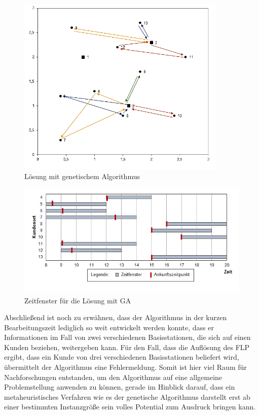 \documentclass[a4paper,12pt,parskip,bibtotoc,liststotoc]{article}
\begin{document}
\begin{figure}[h!]
  \begin{center}
      \includegraphics[width=100mm]{vrp33a.png}
    \caption{Lösung mit genetischem Algorithmus}  \label{Typen}
  \end{center}
\end{figure}


\begin{figure}[h!]
  \begin{center}
    \includegraphics[width=150mm]{zf1.jpg}
    \caption{Zeitfenster für die Lösung mit GA}  \label{Typen}
  \end{center}
\end{figure}



Abschließend ist noch zu erwähnen, dass der Algorithmus in der kurzen Bearbeitungszeit lediglich so weit entwickelt werden konnte, dass er Informationen im Fall von zwei verschiedenen Basisstationen, die sich auf einen Kunden beziehen, weitergeben kann.
Für den Fall, dass die Auflösung des FLP ergibt, dass ein Kunde von drei verschiedenen Basisstationen beliefert wird, übermittelt der Algorithmus eine Fehlermeldung.
Somit ist hier viel Raum für Nachforschungen entstanden, um den Algorithmus auf eine allgemeine Problemstellung anwenden zu können, gerade im Hinblick darauf, dass ein metaheuristisches Verfahren wie es der genetische Algorithmus darstellt erst ab einer bestimmten Instanzgröße sein volles Potential zum Ausdruck bringen kann.
\end{document}
